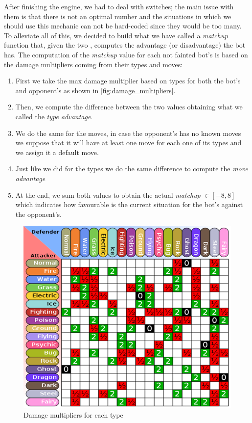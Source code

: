 After finishing the engine, we had to deal with switches; the main issue with them is that there is not an optimal number and the situations in which we should use this mechanic can not be hard-coded since they would be too many. To alleviate all of this, we decided to build what we have called a \textit{matchup} function that, given the two \poke, computes the advantage (or disadvantage) the bot has. The computation of the \textit{matchup} value for each not fainted bot's \poke is based on the damage multipliers coming from their types and moves:
\begin{enumerate}
    \item First we take the max damage multiplier based on types for both the bot's and opponent's \poke as shown in \autoref{fig:damage_multipliers}.
    \item Then, we compute the difference between the two values obtaining what we called the \textit{type advantage}.
    \item We do the same for the moves, in case the opponent's \poke has no known moves we suppose that it will have at least one move for each one of its types and we assign it a default move.
    \item Just like we did for the types we do the same difference to compute the \textit{move advantage}
    \item At the end, we sum both values to obtain the actual \textit{matchup} $\in [-8,8]$ which indicates how favourable is the current situation for the bot's \poke against the opponent's.
\end{enumerate}
\begin{figure}[!htbp]
    \centering
    \includegraphics[width=0.8\linewidth]{images/damage_multipliers.png}
    \caption{Damage multipliers for each type}
    \label{fig:damage_multipliers}
\end{figure}

